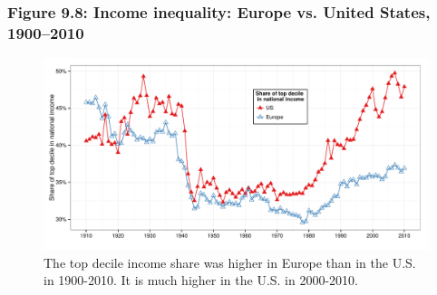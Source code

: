 \documentclass[t]{beamer}\usepackage[]{graphicx}\usepackage[]{color}
\newenvironment{knitrout}{}{} %
\begin{document}
\begin{frame}[label=Figure_9_8]
\frametitle{Figure 9.8: Income inequality: Europe vs. United States, 1900--2010}
\begin{figure}[t]
\begin{minipage}[b]{\textwidth}
\centering
\begin{knitrout}\footnotesize
{}\color{fgcolor}

{\centering \includegraphics[width=1\linewidth]{figures/color/Figure_9_8} 

}



\end{knitrout}
\caption{The top decile income share was higher in Europe than in the U.S. in 1900-2010. It is much higher in the U.S. in 2000-2010.}
\end{minipage}
\end{figure}
\end{frame}
\end{document}
